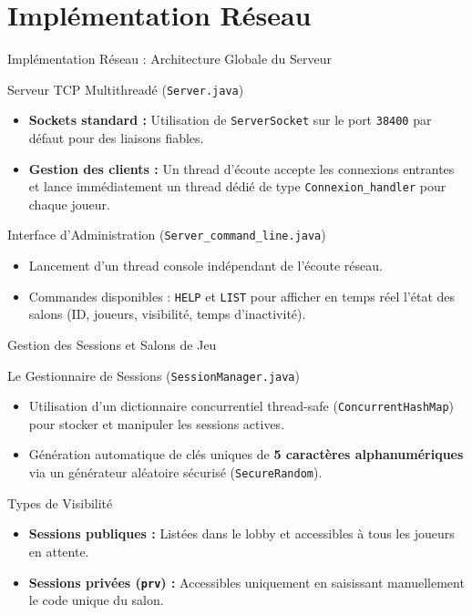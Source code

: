 \documentclass{beamer}
\begin{document}
\section{Implémentation Réseau}

\begin{frame}{Implémentation Réseau : Architecture Globale du Serveur}
    \begin{block}{Serveur TCP Multithreadé (\texttt{Server.java})}
        \begin{itemize}
            \item \textbf{Sockets standard :} Utilisation de \texttt{ServerSocket} sur le port \texttt{38400} par défaut pour des liaisons fiables.
            \item \textbf{Gestion des clients :} Un thread d'écoute accepte les connexions entrantes et lance immédiatement un thread dédié de type \texttt{Connexion\_handler} pour chaque joueur.
        \end{itemize}
    \end{block}
    \begin{block}{Interface d'Administration (\texttt{Server\_command\_line.java})}
        \begin{itemize}
            \item Lancement d'un thread console indépendant de l'écoute réseau.
            \item Commandes disponibles : \texttt{HELP} et \texttt{LIST} pour afficher en temps réel l'état des salons (ID, joueurs, visibilité, temps d'inactivité).
        \end{itemize}
    \end{block}
\end{frame}

\begin{frame}{Gestion des Sessions et Salons de Jeu}
    \begin{block}{Le Gestionnaire de Sessions (\texttt{SessionManager.java})}
        \begin{itemize}
            \item Utilisation d'un dictionnaire concurrentiel thread-safe (\texttt{ConcurrentHashMap}) pour stocker et manipuler les sessions actives.
            \item Génération automatique de clés uniques de \textbf{5 caractères alphanumériques} via un générateur aléatoire sécurisé (\texttt{SecureRandom}).
        \end{itemize}
    \end{block}
    \begin{block}{Types de Visibilité}
        \begin{itemize}
            \item \textbf{Sessions publiques :} Listées dans le lobby et accessibles à tous les joueurs en attente.
            \item \textbf{Sessions privées (\texttt{prv}) :} Accessibles uniquement en saisissant manuellement le code unique du salon.
        \end{itemize}
    \end{block}
\end{frame}
\end{document}
